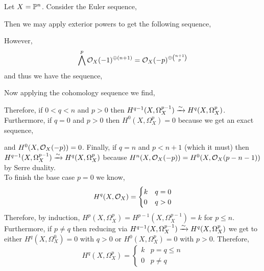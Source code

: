 \documentclass[12pt]{article}
\begin{document}
Let $X = \P^n$. Consider the Euler sequence,
\begin{center}
\end{center}
Then we may apply exterior powers to get the following sequence,
\begin{center}
\end{center}
However, 
\[ \bigwedge^p \struct{X}(-1)^{\oplus (n+1)} = \struct{X}(-p)^{\oplus { n + 1 \choose p }} \] 
and thus we have the sequence,
\begin{center}
\end{center}
Now applying the cohomology sequence we find,
\begin{center}
\end{center}
Therefore, if $0 < q < n$ and $p > 0$ then $H^{q-1}(X, \Omega^{p-1}_{X}) \iso H^q(X, \Omega^p_{X})$. Furthermore, if $q = 0$ and $p > 0$ then $H^0(X, \Omega^p_{X}) = 0$ because we get an exact sequence,
\begin{center}
\end{center}
and $H^0(X, \struct{X}(-p)) = 0$. Finally, if $q = n$ and $p < n + 1$ (which it must) then $H^{q-1}(X, \Omega_X^{p-1}) \iso H^q(X, \Omega_X^p)$ because $H^n(X, \struct{X}(-p)) = H^0(X, \struct{X}(p - n - 1))$ by Serre duality.
\bigskip\\
To finish the base case $p = 0$ we know,
\[ H^q(X, \struct{X}) = 
\begin{cases}
k & q = 0
\\
0 & q > 0
\end{cases} \]
Therefore, by induction, $H^p(X, \Omega_X^p) = H^{p-1}(X, \Omega_X^{p-1}) = k$ for $p \le n$. Furthermore, if $p \neq q$ then reducing via $H^{q-1}(X, \Omega^{p-1}_{X}) \iso H^q(X, \Omega^p_{X})$ we get to either $H^q(X, \Omega^0_X) = 0$ with $q > 0$ or $H^0(X, \Omega^p_X) = 0$ with $p > 0$. Therefore,
\[ H^q(X, \Omega^p_X) = 
\begin{cases}
k & p = q \le n
\\
0 & p \neq q
\end{cases} \]
\end{document}
